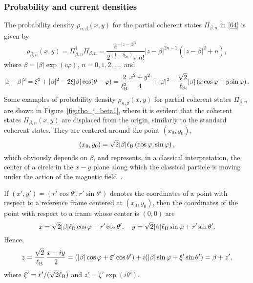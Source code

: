\documentclass[aps,showpacs,showkeys]{revtex4}
\begin{document}
\subsubsection{Probability and current densities}\label{sec3.1.2}
The probability density $\rho_{n,\beta}(x,y)$ for the partial coherent states $\Pi_{\beta,n}$ in \eqref{64} is given by
\begin{equation}\label{65}
\rho_{\beta,n}(x,y)=\Pi^\dagger_{\beta,n} \Pi_{\beta,n}=\frac{e^{-\vert z-\beta\vert^2}}{2^{(1-\delta_{0n})}\pi\,n!}\vert z-\beta\vert^{2n-2}(\vert z-\beta\vert^{2}+n),
\end{equation}
where $\beta=\vert\beta\vert\exp(i\varphi)$, $n=0,1,2,\dots$, and
	\begin{equation}
 	\vert z-\beta \vert^2=\xi^2+\vert\beta\vert^2-2\xi\vert\beta\vert\cos(\theta-\varphi)=\frac{2}{\ell_{\rm B}^{2}}\frac{x^2+y^2}{4}+\vert\beta\vert^2-\frac{\sqrt{2}}{\ell_{\rm B}}\vert\beta\vert\left(x\cos\varphi+y\sin\varphi\right). \label{65b}
	\end{equation}
Some examples of probability density $\rho_{n,\beta}(x,y)$ for partial coherent states $\Pi_{\beta,n}$ are shown in Figure~\ref{fig:rho_j_beta1}, where it is evident that the coherent states $\Pi_{\beta,n}(x,y)$ are displaced from the origin, similarly to the standard coherent states. They are centered around the point $(x_0,y_0)$, 
\begin{equation}\label{66}
(x_0,y_0)=\sqrt{2}\vert\beta\vert\ell_{\rm B}\left(\cos\varphi,\sin\varphi\right),
\end{equation}
which obviously depends on $\beta$, and represents, in a classical interpretation, the center of a circle in the 
$x-y$ plane along which the classical particle is moving under the action of the magnetic field~\cite{kr05}.


If $(x',y')=(r'\cos\theta',r'\sin\theta')$ denotes the coordinates of a point with respect to a reference frame centered at $(x_0,y_0)$, then the coordinates of the point with respect to a frame whose center is $(0,0)$ are
\begin{equation}\label{67}
x=\sqrt{2}\vert\beta\vert\ell_{\rm B}\cos\varphi+r'\cos\theta', \quad y=\sqrt{2}\vert\beta\vert\ell_{\rm B}\sin\varphi+r'\sin\theta'.
\end{equation}
Hence,
\begin{equation}\label{68}
  z=\frac{\sqrt{2}}{\ell_{\rm B}}\,\frac{x+iy}{2}=(\vert\beta\vert\cos\varphi+\xi'\cos\theta')+i(\vert\beta\vert\sin\varphi+\xi'\sin\theta')=\beta+z',
\end{equation}
where $\xi'=r'/(\sqrt{2}\ell_{\rm B})$ and $z'=\xi'\exp(i\theta')$.
\end{document}
